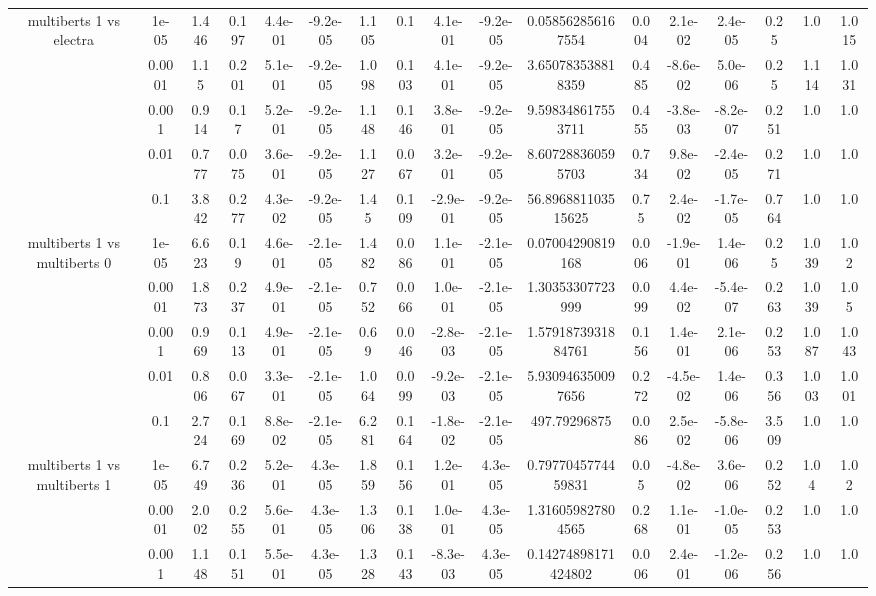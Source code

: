 \begin{tabular}{|c|c|c|c|c|c|c|c|c|c|c|c|c|c|c|c|c|}
\hline
\multirow{5}{*}{multiberts 1 vs electra } & 1e-05 & 1.446 & 0.197 & 4.4e-01 & -9.2e-05 & 1.105 & 0.1 & 4.1e-01 & -9.2e-05 & 0.058562856167554 & 0.004 & 2.1e-02 & 2.4e-05 & 0.25 & 1.0 & 1.015 \\
 & 0.0001 & 1.15 & 0.201 & 5.1e-01 & -9.2e-05 & 1.098 & 0.103 & 4.1e-01 & -9.2e-05 & 3.650783538818359 & 0.485 & -8.6e-02 & 5.0e-06 & 0.25 & 1.114 & 1.031 \\
 & 0.001 & 0.914 & 0.17 & 5.2e-01 & -9.2e-05 & 1.148 & 0.146 & 3.8e-01 & -9.2e-05 & 9.598348617553711 & 0.455 & -3.8e-03 & -8.2e-07 & 0.251 & 1.0 & 1.0 \\
 & 0.01 & 0.777 & 0.075 & 3.6e-01 & -9.2e-05 & 1.127 & 0.067 & 3.2e-01 & -9.2e-05 & 8.607288360595703 & 0.734 & 9.8e-02 & -2.4e-05 & 0.271 & 1.0 & 1.0 \\
 & 0.1 & 3.842 & 0.277 & 4.3e-02 & -9.2e-05 & 1.45 & 0.109 & -2.9e-01 & -9.2e-05 & 56.896881103515625 & 0.75 & 2.4e-02 & -1.7e-05 & 0.764 & 1.0 & 1.0 \\
\hline
\multirow{5}{*}{multiberts 1 vs multiberts 0} & 1e-05 & 6.623 & 0.19 & 4.6e-01 & -2.1e-05 & 1.482 & 0.086 & 1.1e-01 & -2.1e-05 & 0.07004290819168 & 0.006 & -1.9e-01 & 1.4e-06 & 0.25 & 1.039 & 1.02 \\
 & 0.0001 & 1.873 & 0.237 & 4.9e-01 & -2.1e-05 & 0.752 & 0.066 & 1.0e-01 & -2.1e-05 & 1.30353307723999 & 0.099 & 4.4e-02 & -5.4e-07 & 0.263 & 1.039 & 1.05 \\
 & 0.001 & 0.969 & 0.113 & 4.9e-01 & -2.1e-05 & 0.69 & 0.046 & -2.8e-03 & -2.1e-05 & 1.5791873931884761 & 0.156 & 1.4e-01 & 2.1e-06 & 0.253 & 1.087 & 1.043 \\
 & 0.01 & 0.806 & 0.067 & 3.3e-01 & -2.1e-05 & 1.064 & 0.099 & -9.2e-03 & -2.1e-05 & 5.930946350097656 & 0.272 & -4.5e-02 & 1.4e-06 & 0.356 & 1.003 & 1.001 \\
 & 0.1 & 2.724 & 0.169 & 8.8e-02 & -2.1e-05 & 6.281 & 0.164 & -1.8e-02 & -2.1e-05 & 497.79296875 & 0.086 & 2.5e-02 & -5.8e-06 & 3.509 & 1.0 & 1.0 \\
\hline
\multirow{5}{*}{multiberts 1 vs multiberts 1} & 1e-05 & 6.749 & 0.236 & 5.2e-01 & 4.3e-05 & 1.859 & 0.156 & 1.2e-01 & 4.3e-05 & 0.7977045774459831 & 0.05 & -4.8e-02 & 3.6e-06 & 0.252 & 1.04 & 1.02 \\
 & 0.0001 & 2.002 & 0.255 & 5.6e-01 & 4.3e-05 & 1.306 & 0.138 & 1.0e-01 & 4.3e-05 & 1.316059827804565 & 0.268 & 1.1e-01 & -1.0e-05 & 0.253 & 1.0 & 1.0 \\
 & 0.001 & 1.148 & 0.151 & 5.5e-01 & 4.3e-05 & 1.328 & 0.143 & -8.3e-03 & 4.3e-05 & 0.14274898171424802 & 0.006 & 2.4e-01 & -1.2e-06 & 0.256 & 1.0 & 1.0 \\

\end{tabular}
